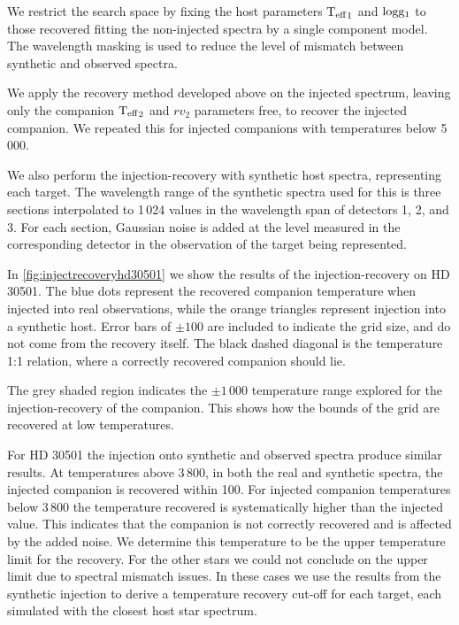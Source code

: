 We restrict the search space by fixing the host parameters \({\textrm{T}_{\mathrm{eff}}}_{1}\) and \(\textrm{logg}{}_1\) to those recovered fitting the non-injected spectra by a single component model.
The wavelength masking is used to reduce the level of mismatch between synthetic and observed spectra.

We apply the recovery method developed above on the injected spectrum, leaving only the companion \({\textrm{T}_{\mathrm{eff}}}_{2}\) and \({rv}_2\) parameters free, to recover the injected companion.
We repeated this for injected companions with temperatures below 5\,000\K{}.

We also perform the injection-recovery with synthetic host spectra, representing each target.
The wavelength range of the synthetic spectra used for this is three sections interpolated to 1\,024 values in the wavelength span of detectors 1, 2, and 3.
For each section, Gaussian noise is added at the level measured in the corresponding detector in the observation of the target being represented.

In \cref{fig:injectrecoveryhd30501} we show the results of the injection-recovery on {HD 30501}.
The blue dots represent the recovered companion temperature when injected into real observations, while the orange triangles represent injection into a synthetic host.
Error bars of \(\pm100\)\K{} are included to indicate the grid size, and do not come from the recovery itself.
The black dashed diagonal is the temperature 1:1 relation, where a correctly recovered companion should lie.

The grey shaded region indicates the \(\pm1\,000\)\K{} temperature range explored for the injection-recovery of the companion.
This shows how the bounds of the grid are recovered at low temperatures.

For {HD 30501} the injection onto synthetic and observed spectra produce similar results.
At temperatures above 3\,800\K{}, in both the real and synthetic spectra, the injected companion is recovered within 100\K{}.
For injected companion temperatures below 3\,800\K{} the temperature recovered is systematically higher than the injected value.
This indicates that the companion is not correctly recovered and is affected by the added noise.
We determine this temperature to be the upper temperature limit for the recovery.
For the other stars we could not conclude on the upper limit due to spectral mismatch issues.
In these cases we use the results from the synthetic injection to derive a temperature recovery cut-off for each target, each simulated with the closest host star spectrum.

